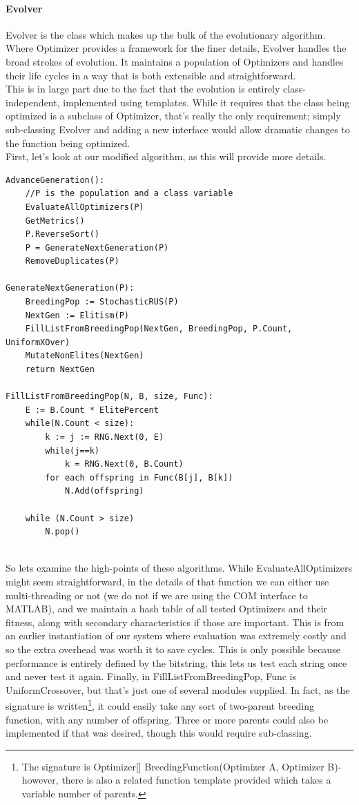 \paragraph{Evolver}
Evolver is the class which makes up the bulk of the evolutionary algorithm.  Where Optimizer provides a framework for the finer details, Evolver handles the broad strokes of evolution.  It maintains a population of Optimizers and handles their life cycles in a way that is both extensible and straightforward.  \\This is in large part due to the fact that the evolution is entirely class-independent, implemented using templates. While it requires that the class being optimized is a subclass of Optimizer, that's really the only requirement; simply sub-classing Evolver and adding a new interface would allow dramatic changes to the function being optimized.\\First, let's look at our modified algorithm, as this will provide more details.
\begin{lstlisting}[caption= {Evolver Algorithm}, label = {fig:evolverAlgorithm}]
AdvanceGeneration():
	//P is the population and a class variable 
	EvaluateAllOptimizers(P)
	GetMetrics()
	P.ReverseSort()
	P = GenerateNextGeneration(P)
	RemoveDuplicates(P)

GenerateNextGeneration(P):
	BreedingPop := StochasticRUS(P)
	NextGen := Elitism(P)
	FillListFromBreedingPop(NextGen, BreedingPop, P.Count, UniformXOver)
	MutateNonElites(NextGen)
	return NextGen
	
FillListFromBreedingPop(N, B, size, Func):
	E := B.Count * ElitePercent
	while(N.Count < size):
		k := j := RNG.Next(0, E)
		while(j==k) 
			k = RNG.Next(0, B.Count)
		for each offspring in Func(B[j], B[k])
			N.Add(offspring)

	while (N.Count > size)
		N.pop()
	
\end{lstlisting}
So lets examine the high-points of these algorithms.  While EvaluateAllOptimizers might seem straightforward, in the details of that function we can either use multi-threading or not (we do not if we are using the COM interface to MATLAB), and we maintain a hash table of all tested Optimizers and their fitness, along with secondary characteristics if those are important.  This is from an earlier instantiation of our system where evaluation was extremely costly and so the extra overhead was worth it to save cycles. This is only possible because performance is entirely defined by the bitstring, this lets us test each string once and never test it again.  Finally, in FillListFromBreedingPop,  Func is UniformCrossover, but that's just one of several modules supplied.  In fact, as the signature is written\footnote{The signature is Optimizer[] BreedingFunction(Optimizer A, Optimizer B)- however, there is also a related function template provided which takes a variable number of parents.}, it could easily take any sort of two-parent breeding function, with any number of offspring.  Three or more parents could also be implemented if that was desired, though this would require sub-classing.\\
